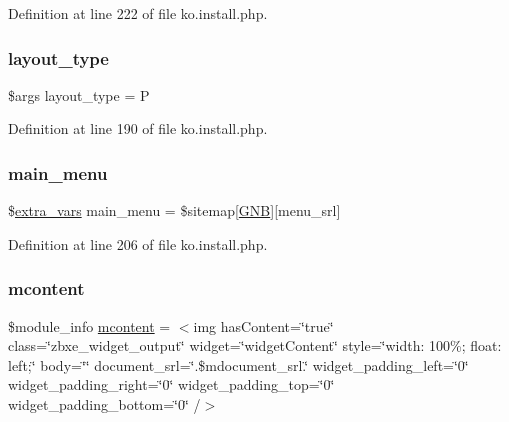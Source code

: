 Definition at line 222 of file ko.\+install.\+php.

\hypertarget{ko_8install_8php_a0532d89570cfdaebc628afac2ff5a81b}{}\label{ko_8install_8php_a0532d89570cfdaebc628afac2ff5a81b} 
\subsubsection{\texorpdfstring{layout\+\_\+type}{layout\_type}}
{\footnotesize\ttfamily \$args layout\+\_\+type = \textquotesingle{}P\textquotesingle{}}



Definition at line 190 of file ko.\+install.\+php.

\hypertarget{ko_8install_8php_ac71104c770b8ced3891f35849d3f2906}{}\label{ko_8install_8php_ac71104c770b8ced3891f35849d3f2906} 
\subsubsection{\texorpdfstring{main\+\_\+menu}{main\_menu}}
{\footnotesize\ttfamily \$\hyperlink{ko_8install_8php_ae1dcb37fc34a8f312d2e6abd6f806743}{extra\+\_\+vars} main\+\_\+menu = \$sitemap\mbox{[}\textquotesingle{}\hyperlink{ko_8install_8php_a9b1716b68fc04f3492448f38148dcbf5}{G\+NB}\textquotesingle{}\mbox{]}\mbox{[}\textquotesingle{}menu\+\_\+srl\textquotesingle{}\mbox{]}}



Definition at line 206 of file ko.\+install.\+php.

\hypertarget{ko_8install_8php_a9da4bb6e77356bb68ae0e05dbd9f5e2f}{}\label{ko_8install_8php_a9da4bb6e77356bb68ae0e05dbd9f5e2f} 
\subsubsection{\texorpdfstring{mcontent}{mcontent}}
{\footnotesize\ttfamily \$module\+\_\+info \hyperlink{classmcontent}{mcontent} = \textquotesingle{}$<$img has\+Content=\char`\"{}true\char`\"{} class=\char`\"{}zbxe\+\_\+widget\+\_\+output\char`\"{} widget=\char`\"{}widget\+Content\char`\"{} style=\char`\"{}width\+: 100\%; float\+: left;\char`\"{} body=\char`\"{}\char`\"{} document\+\_\+srl=\char`\"{}\textquotesingle{}.\$mdocument\+\_\+srl.\textquotesingle{}\char`\"{} widget\+\_\+padding\+\_\+left=\char`\"{}0\char`\"{} widget\+\_\+padding\+\_\+right=\char`\"{}0\char`\"{} widget\+\_\+padding\+\_\+top=\char`\"{}0\char`\"{} widget\+\_\+padding\+\_\+bottom=\char`\"{}0\char`\"{} /$>$\textquotesingle{}}



